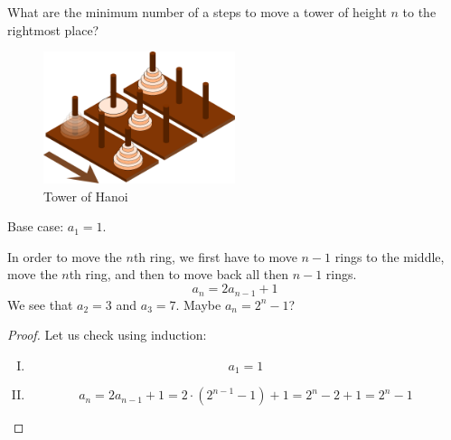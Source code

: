 \documentclass[00_complete]{subfiles}
\begin{document}
\begin{example}
    What are the minimum number of a steps to move a tower of height $n$ to the rightmost
    place?

    \begin{figure}[ht]
  \centering
    \includegraphics[width=0.5\textwidth]{w8-tower}
    \caption{Tower of Hanoi}
\end{figure}

    Base case: $a_1=1$.

    In order to move the $n$th ring, we first have to move $n-1$ rings to the
    middle, move the $n$th ring, and then to move back all then $n-1$ rings.
    $$a_n=2a_{n-1}+1$$
    We see that $a_2=3$ and $a_3=7$. Maybe $a_n = 2^n-1$?
    \begin{proof}
    Let us check using induction:
    \begin{enumerate}[I.]
        \item \begin{equation}
            a_1=1 \tag{\checkmark}
        \end{equation}
        \item \begin{equation}
            a_n = 2a_{n-1}+1=2\cdot(2^{n-1}-1)+1=2^n-2+1=2^n-1
            \tag{\checkmark}
        \end{equation}
    \end{enumerate}
    \end{proof}
\end{example}
\end{document}
